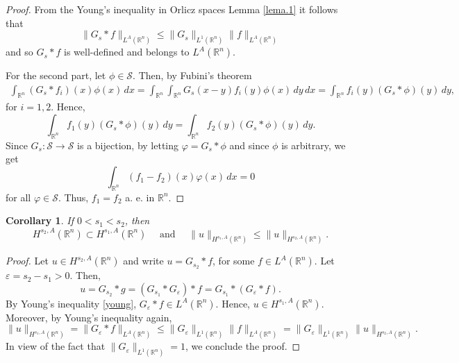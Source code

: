 \documentclass[leqno,twoside, 12pt]{amsart}
\theoremstyle{plain}
\numberwithin{equation}{section} \numberwithin{figure}{section}
\newtheorem{corollary}[theorem]{Corollary}
\theoremstyle{definition}
\numberwithin{equation}{section}
\begin{document}
\begin{proof}
From the Young's inequality in Orlicz spaces Lemma \ref{lema.1} it follows that
\begin{equation}\label{young}
\|G_s*f\|_{L^A(\mathbb{R}^n)}\leq \|G_s\|_{L^1(\mathbb{R}^n)}\|f\|_{L^A(\mathbb{R}^n)}
\end{equation}and so $G_s*f$ is well-defined and belongs to $L^A(\mathbb{R}^n)$.

For the second part, let $\phi \in \mathcal{S}$. Then, by Fubini's theorem
\begin{equation}
\begin{split}
\int_{\mathbb{R}^n}(G_s*f_i)(x)\phi(x)\,dx = \int_{\mathbb{R}^n}\int_{\mathbb{R}^n}G_s(x-y)f_i(y)\phi(x)\,dy\,dx = \int_{\mathbb{R}^n}f_i(y)(G_s*\phi)(y)\,dy,
\end{split}
\end{equation}for $i=1, 2$. Hence,
$$ 
\int_{\mathbb{R}^n}f_1(y)(G_s*\phi)(y)\,dy = \int_{\mathbb{R}^n}f_2(y)(G_s*\phi)(y)\,dy.
$$
Since $G_s:\mathcal{S}\to \mathcal{S}$ is a bijection, by letting $\varphi= G_s*\phi$ and since $\phi$ is arbitrary, we get
$$
\int_{\mathbb{R}^n}(f_1-f_2)(x)\varphi(x)\,dx=0
$$
for all $\varphi\in \mathcal{S}$. Thus,  $f_1=f_2$ a. e. in $\mathbb{R}^n$.
\end{proof}

\begin{corollary}If $0<s_1<s_2$, then
$$H^{s_2, A}(\mathbb{R}^n)\subset H^{s_1, A}(\mathbb{R}^n) \quad\text{ and }\quad\|u\|_{H^{s_1, A}(\mathbb{R}^n)}\leq \|u\|_{H^{s_2, A}(\mathbb{R}^n)}.$$
\end{corollary}

\begin{proof}
Let $u\in H^{s_2, A}(\mathbb{R}^n)$ and write $u=G_{s_2}*f$, for some $f\in L^A(\mathbb{R}^n)$. Let $\varepsilon=s_2-s_1>0$. Then,
\begin{equation}
u=G_{s_2}*g = (G_{s_1}*G_{\varepsilon})*f = G_{s_1}*(G_\varepsilon*f).
\end{equation}
By Young's inequality \eqref{young}, $G_\varepsilon*f\in L^A(\mathbb{R}^n)$. Hence, $u\in  H^{s_1, A}(\mathbb{R}^n)$. Moreover, by Young's inequality again,
$$\|u\|_{H^{s_1, A}(\mathbb{R}^n)} = \|G_\varepsilon*f\|_{L^A(\mathbb{R}^n)}\leq \|G_\varepsilon\|_{L^1(\mathbb{R}^n)}\|f\|_{L^A(\mathbb{R}^n)}= \|G_\varepsilon\|_{L^1(\mathbb{R}^n)}\|u\|_{H^{s_2, A}(\mathbb{R}^n)}.$$
In view of the fact that $\|G_\varepsilon\|_{L^1(\mathbb{R}^n)}=1$, we conclude the proof.
\end{proof}
\end{document}
